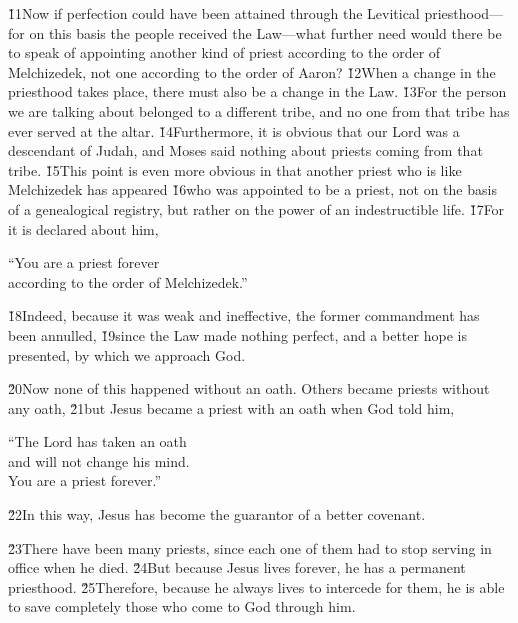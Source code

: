 \v{11}Now if perfection could have been attained through the Levitical priesthood---for on this basis the people received the Law---what further need would there be to speak of appointing another kind of priest according to the order of Melchizedek, not one according to the order of Aaron? \v{12}When a change in the priesthood takes place, there must also be a change in the Law. \v{13}For the person we are talking about belonged to a different tribe, and no one from that tribe has ever served at the altar. \v{14}Furthermore, it is obvious that our Lord was a descendant of Judah, and Moses said nothing about priests coming from that tribe. \v{15}This point is even more obvious in that another priest who is like Melchizedek has appeared \v{16}who was appointed to be a priest, not on the basis of a genealogical registry, but rather on the power of an indestructible life. \v{17}For it is declared about him,

\begin{poetry}
\poeml ``You are a priest forever \\
\poemll    according to the order of Melchizedek.''
\end{poetry}

\v{18}Indeed, because it was weak and ineffective, the former commandment has been annulled, \v{19}since the Law made nothing perfect, and a better hope is presented, by which we approach God.

\v{20}Now none of this happened without an oath. Others became priests without any oath, \v{21}but Jesus became a priest with an oath when God told him,

\begin{poetry}
\poeml ``The Lord has taken an oath \\
\poemll    and will not change his mind. \\
\poeml You are a priest forever.''
\end{poetry}

\v{22}In this way, Jesus has become the guarantor of a better covenant.

\v{23}There have been many priests, since each one of them had to stop serving in office when he died. \v{24}But because Jesus lives forever, he has a permanent priesthood. \v{25}Therefore, because he always lives to intercede for them, he is able to save completely those who come to God through him.

